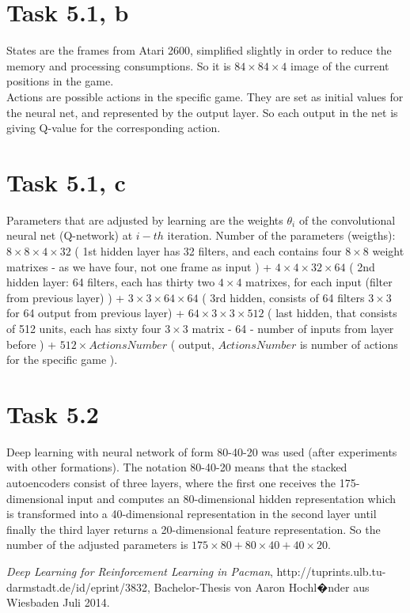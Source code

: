 \documentclass[english]{scrartcl}
\begin{document}
\section*{Task 5.1, b}
States are the frames from Atari 2600, simplified slightly in order to reduce the memory and processing consumptions. So it is $84\times84\times4$ image of the current positions in the game. 
\\Actions are possible actions in the specific game. They are set as initial values for the neural net, and represented by the output layer. So each output in the net is giving Q-value for the corresponding action.

\section*{Task 5.1, c}
Parameters that are adjusted by learning are the weights $\theta_{i}$ of the convolutional neural net (Q-network) at $i-th$ iteration. Number of the parameters (weigths): $8\times 8\times 4 \times 32$ ( 1st hidden layer has 32 filters, and each contains four $8\times 8$ weight matrixes - as we have four, not one frame as input ) + $4\times 4\times 32 \times 64$ ( 2nd hidden layer: 64 filters, each has thirty two $4\times 4$ matrixes, for each input (filter from previous layer) ) + $3\times 3\times 64\times 64$ ( 3rd hidden, consists of 64 filters $3\times 3$ for 64 output from previous layer) + $64\times3\times3\times 512$ ( last hidden, that consists of 512 units, each has sixty four $3\times 3$ matrix - 64 - number of inputs from layer before ) + $512\times ActionsNumber$ ( output, $ActionsNumber$ is number of actions for the specific game ).

\section*{Task 5.2}
\cite{deep-learning}
Deep learning with neural network of form 80-40-20 was used (after experiments with other formations). The notation 80-40-20 means that the stacked autoencoders consist of three layers, where
the first one receives the 175-dimensional input and computes an 80-dimensional hidden representation which is transformed into a 40-dimensional representation in the second layer until finally the third layer returns a 20-dimensional feature representation. So the number of the adjusted parameters is $175\times 80 + 80 \times 40 + 40 \times 20$.

\begin{thebibliography}{9}

  \emph{Deep Learning for Reinforcement Learning in Pacman},
   http://tuprints.ulb.tu-darmstadt.de/id/eprint/3832,
  Bachelor-Thesis von Aaron Hochl�nder aus Wiesbaden
  Juli 2014.

\end{thebibliography}
\end{document}
